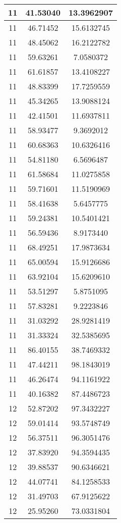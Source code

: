 \documentclass[
]{book}
\begin{document}
\begin{tabular}{c|c|c}
\hline
11 & 41.53040 & 13.3962907\\
\hline
11 & 46.71452 & 15.6132745\\
\hline
11 & 48.45062 & 16.2122782\\
\hline
11 & 59.63261 & 7.0580372\\
\hline
11 & 61.61857 & 13.4108227\\
\hline
11 & 48.83399 & 17.7259559\\
\hline
11 & 45.34265 & 13.9088124\\
\hline
11 & 42.41501 & 11.6937811\\
\hline
11 & 58.93477 & 9.3692012\\
\hline
11 & 60.68363 & 10.6326416\\
\hline
11 & 54.81180 & 6.5696487\\
\hline
11 & 61.58684 & 11.0275858\\
\hline
11 & 59.71601 & 11.5190969\\
\hline
11 & 58.41638 & 5.6457775\\
\hline
11 & 59.24381 & 10.5401421\\
\hline
11 & 56.59436 & 8.9173440\\
\hline
11 & 68.49251 & 17.9873634\\
\hline
11 & 65.00594 & 15.9126686\\
\hline
11 & 63.92104 & 15.6209610\\
\hline
11 & 53.51297 & 5.8751095\\
\hline
11 & 57.83281 & 9.2223846\\
\hline
11 & 31.03292 & 28.9281419\\
\hline
11 & 31.33324 & 32.5385695\\
\hline
11 & 86.40155 & 38.7469332\\
\hline
11 & 47.44211 & 98.1843019\\
\hline
11 & 46.26474 & 94.1161922\\
\hline
11 & 40.16382 & 87.4486723\\
\hline
12 & 52.87202 & 97.3432227\\
\hline
12 & 59.01414 & 93.5748749\\
\hline
12 & 56.37511 & 96.3051476\\
\hline
12 & 37.83920 & 94.3594435\\
\hline
12 & 39.88537 & 90.6346621\\
\hline
12 & 44.07741 & 84.1258533\\
\hline
12 & 31.49703 & 67.9125622\\
\hline
12 & 25.95260 & 73.0331804\\

\end{tabular}
\end{document}
